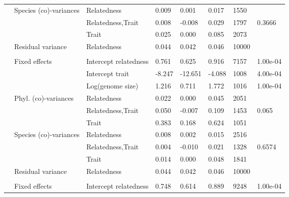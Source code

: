 \begin{longtable}[t]{llllllll}
\hspace{1em} & Species (co)-variances & Relatedness & 0.009 & 0.001 & 0.017 & 1550 & \\
\hspace{1em} &  & Relatedness,Trait & 0.008 & -0.008 & 0.029 & 1797 & 0.3666\\
\hspace{1em} &  & Trait & 0.025 & 0.000 & 0.085 & 2073 & \\
\hspace{1em} & Residual variance & Relatedness & 0.044 & 0.042 & 0.046 & 10000 \vphantom{2} & \\
\addlinespace[0.3em]
\multicolumn{8}{l}{\textbf{Biofilm}}\\
\hspace{1em} & Fixed effects & Intercept relatedness & 0.761 & 0.625 & 0.916 & 7157 & 1.00e-04\\
\hspace{1em} &  & Intercept trait & -8.247 & -12.651 & -4.088 & 1008 & 4.00e-04\\
\hspace{1em} &  & Log(genome size) & 1.216 & 0.711 & 1.772 & 1016 & 1.00e-04\\
\hspace{1em} & Phyl. (co)-variances & Relatedness & 0.022 & 0.000 & 0.045 & 2051 & \\
\hspace{1em} &  & Relatedness,Trait & 0.050 & -0.007 & 0.109 & 1453 & 0.065\\
\hspace{1em} &  & Trait & 0.383 & 0.168 & 0.624 & 1051 & \\
\hspace{1em} & Species (co)-variances & Relatedness & 0.008 & 0.002 & 0.015 & 2516 & \\
\hspace{1em} &  & Relatedness,Trait & 0.004 & -0.010 & 0.021 & 1328 & 0.6574\\
\hspace{1em} &  & Trait & 0.014 & 0.000 & 0.048 & 1841 & \\
\hspace{1em} & Residual variance & Relatedness & 0.044 & 0.042 & 0.046 & 10000 \vphantom{1} & \\
\addlinespace[0.3em]
\multicolumn{8}{l}{\textbf{Antibiotic degradation}}\\
\hspace{1em} & Fixed effects & Intercept relatedness & 0.748 & 0.614 & 0.889 & 9248 & 1.00e-04\\

\end{longtable}
